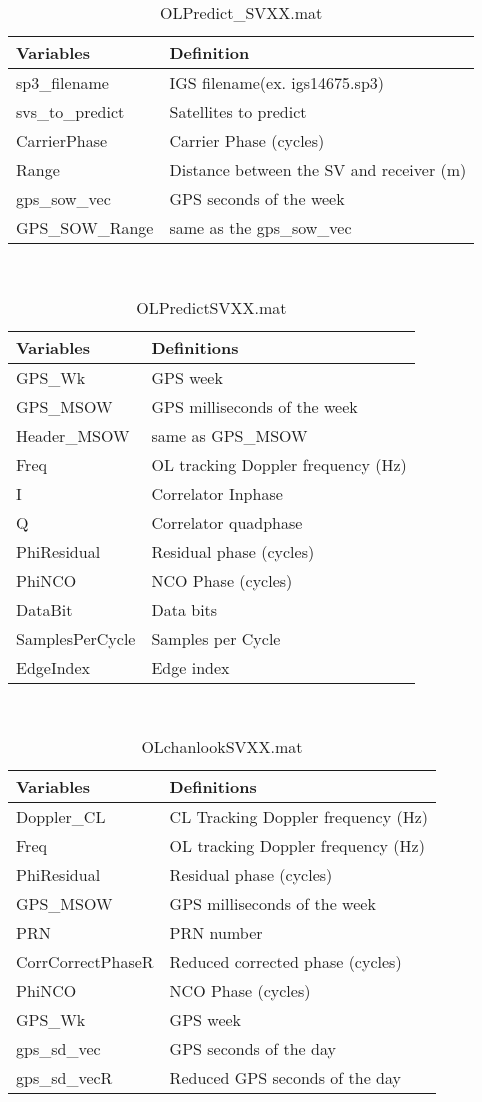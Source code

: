 \documentclass[12pt,letterpaper,oneside]{report}
\begin{document}
\begin{table}[H]
\caption{OLPredict\_SVXX.mat}
\centering
\begin{tabular}{l l}
\hline\hline
Variables&Definition \\[0.5ex]
\hline
sp3\_filename&IGS filename(ex. igs14675.sp3)\\
svs\_to\_predict&Satellites to predict\\
CarrierPhase&Carrier Phase (cycles)\\
Range&Distance between the SV and receiver (m)\\
gps\_sow\_vec&GPS seconds of the week\\
GPS\_SOW\_Range&same as the gps\_sow\_vec\\
\hline
\end{tabular}
\label{tab:OLpredictMAT1}
\end{table}\\
\begin{table}[H]
\caption{OLPredictSVXX.mat}
\centering
\begin{tabular}{l l}
\hline\hline
Variables&Definitions \\[0.5ex]
\hline
GPS\_Wk&GPS week\\
GPS\_MSOW&GPS milliseconds of the week\\
Header\_MSOW&same as GPS\_MSOW\\
Freq&OL tracking Doppler frequency (Hz)\\
I&Correlator Inphase\\
Q&Correlator quadphase\\
PhiResidual&Residual phase (cycles)\\
PhiNCO&NCO Phase (cycles)\\
DataBit&Data bits\\
SamplesPerCycle&Samples per Cycle \\
EdgeIndex&Edge index\\
\hline
\end{tabular}
\label{tab:OLpredictMAT2}
\end{table}\\
\begin{table}[H]
\caption{OLchanlookSVXX.mat}
\centering
\begin{tabular}{l l}
\hline\hline
Variables&Definitions \\[0.5ex]
\hline
Doppler\_CL&CL Tracking Doppler frequency (Hz)\\
Freq&OL tracking Doppler frequency (Hz)\\
PhiResidual&Residual phase (cycles)\\
GPS\_MSOW&GPS milliseconds of the week\\
PRN&PRN number\\
CorrCorrectPhaseR&Reduced corrected phase (cycles)\\
PhiNCO&NCO Phase (cycles)\\
GPS\_Wk&GPS week\\
gps\_sd\_vec&GPS seconds of the day\\
gps\_sd\_vecR&Reduced GPS seconds of the day\\
\hline
\end{tabular}
\label{tab:OLchanlookMAT}
\end{table}\\
\end{document}
